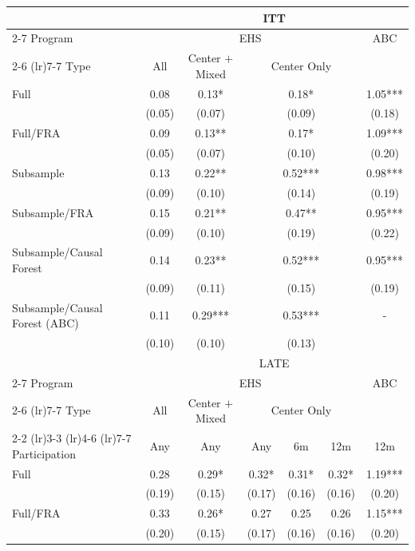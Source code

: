 \begin{tabular}{lcccccc}
\toprule 
\midrule 
 & \multicolumn{6}{c}{ITT} \\
 \cmidrule(lr){2-7} 
Program  & \multicolumn{5}{c}{EHS} & ABC \\
 \cmidrule(lr){2-6} \cmidrule(lr){7-7} 
Type & All & Center $+$ Mixed & \multicolumn{3}{c}{Center Only} &  \\
\midrule 
Full & 0.08 & 0.13* & \multicolumn{3}{c}{0.18*} & 1.05*** \\
 & (0.05) & (0.07) & \multicolumn{3}{c}{(0.09)} & (0.18) \\
Full/FRA & 0.09 & 0.13** & \multicolumn{3}{c}{0.17*} & 1.09*** \\
 & (0.05) & (0.07) & \multicolumn{3}{c}{(0.10)} & (0.20) \\
Subsample & 0.13 & 0.22** & \multicolumn{3}{c}{0.52***} & 0.98*** \\
 & (0.09) & (0.10) & \multicolumn{3}{c}{(0.14)} & (0.19) \\
Subsample/FRA & 0.15 & 0.21** & \multicolumn{3}{c}{0.47**} & 0.95*** \\
 & (0.09) & (0.10) & \multicolumn{3}{c}{(0.19)} & (0.22) \\
Subsample/Causal Forest & 0.14 & 0.23** & \multicolumn{3}{c}{0.52***} & 0.95*** \\
 & (0.09) & (0.11) & \multicolumn{3}{c}{(0.15)} & (0.19) \\
Subsample/Causal Forest (ABC) & 0.11 & 0.29*** & \multicolumn{3}{c}{0.53***} & - \\
 & (0.10) & (0.10) & \multicolumn{3}{c}{(0.13)} \\
\midrule 
\midrule 
 & \multicolumn{6}{c}{LATE} \\
 \cmidrule(lr){2-7} 
Program  & \multicolumn{5}{c}{EHS} & ABC \\
 \cmidrule(lr){2-6} \cmidrule(lr){7-7} 
Type & All & Center $+$ Mixed & \multicolumn{3}{c}{Center Only} &  \\
 \cmidrule(lr){2-2} \cmidrule(lr){3-3} \cmidrule(lr){4-6} \cmidrule(lr){7-7} 
Participation & Any & Any & Any & 6m & 12m & 12m \\
\midrule 
Full & 0.28 & 0.29* & 0.32* & 0.31* & 0.32* & 1.19*** \\
 & (0.19) & (0.15) & (0.17) & (0.16) & (0.16) & (0.20) \\
Full/FRA & 0.33 & 0.26* & 0.27 & 0.25 & 0.26 & 1.15*** \\
 & (0.20) & (0.15) & (0.17) & (0.16) & (0.16) & (0.20) \\

\end{tabular}

